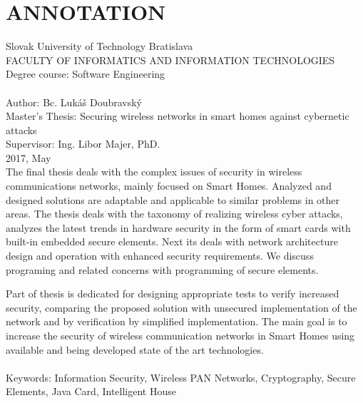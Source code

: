 \documentclass[12pt,a4wide,oneside,openright]{report}
\begin{document}

\chapter*{ANNOTATION}
\thispagestyle{empty}
\noindent Slovak University of Technology Bratislava \\
FACULTY OF INFORMATICS AND INFORMATION TECHNOLOGIES \\
Degree course: Software Engineering \\ \\
Author: \tabto{3.5cm}Bc. Lukáš Doubravský \\
Master's Thesis: 
\tabto{3.5cm}Securing wireless networks in smart homes against cybernetic attacks  \\
Supervisor: \tabto{3.5cm}Ing. Libor Majer, PhD. \\
2017, May \\

The final thesis deals with the complex issues of security in wireless communications networks, mainly focused on Smart Homes. Analyzed and designed solutions are adaptable and applicable to similar problems in other areas.
The thesis deals with the taxonomy of realizing wireless cyber attacks, analyzes the latest trends in hardware security in the form of smart cards with built-in embedded secure elements. Next its deals with network architecture design and operation with enhanced security requirements. We discuss programing and related concerns with programming of secure elements.

Part of thesis is dedicated for designing appropriate tests to verify increased security, comparing the proposed solution with unsecured implementation of the network and by verification by simplified implementation.
The main goal is to increase the security of wireless communication networks in Smart Homes using available and being developed state of the art technologies.
\\ \\
Keywords: Information Security, Wireless PAN Networks, Cryptography, Secure Elements, Java Card, Intelligent House

\newpage
\setcounter{page}{0}
\singlespacing
\tableofcontents
\onehalfspacing

\end{document}
